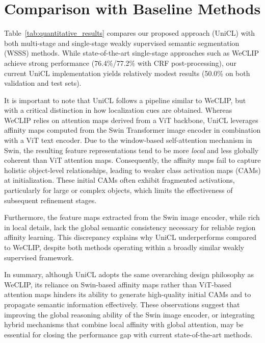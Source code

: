 
\section{Comparison with Baseline Methods}
\label{sec:comparison_with_baseline_methods}
Table~\ref{tab:quantitative_results} compares our proposed approach (UniCL) with both multi-stage and single-stage weakly supervised semantic segmentation (WSSS) methods. While state-of-the-art single-stage approaches such as WeCLIP achieve strong performance (76.4\%/77.2\% with CRF post-processing), our current UniCL implementation yields relatively modest results (50.0\% on both validation and test sets).  

It is important to note that UniCL follows a pipeline similar to WeCLIP, but with a critical distinction in how localization cues are obtained. Whereas WeCLIP relies on attention maps derived from a ViT backbone, UniCL leverages affinity maps computed from the Swin Transformer image encoder in combination with a ViT text encoder. Due to the window-based self-attention mechanism in Swin, the resulting feature representations tend to be more \textit{local} and less globally coherent than ViT attention maps. Consequently, the affinity maps fail to capture holistic object-level relationships, leading to weaker class activation maps (CAMs) at initialization. These initial CAMs often exhibit fragmented activations, particularly for large or complex objects, which limits the effectiveness of subsequent refinement stages.  

Furthermore, the feature maps extracted from the Swin image encoder, while rich in local details, lack the global semantic consistency necessary for reliable region affinity learning. This discrepancy explains why UniCL underperforms compared to WeCLIP, despite both methods operating within a broadly similar weakly supervised framework.  

In summary, although UniCL adopts the same overarching design philosophy as WeCLIP, its reliance on Swin-based affinity maps rather than ViT-based attention maps hinders its ability to generate high-quality initial CAMs and to propagate semantic information effectively. These observations suggest that improving the global reasoning ability of the Swin image encoder, or integrating hybrid mechanisms that combine local affinity with global attention, may be essential for closing the performance gap with current state-of-the-art methods.



